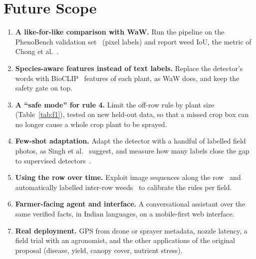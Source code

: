 \chapter{Future Scope}\label{ch:future}

\begin{enumerate}
\item \textbf{A like-for-like comparison with WaW.} Run the pipeline on the PhenoBench validation
  set~\cite{weyler2024phenobench} (pixel labels) and report weed IoU, the metric of Chong et
  al.~\cite{chong2025zeroshot}.
\item \textbf{Species-aware features instead of text labels.} Replace the detector's words with
  BioCLIP~\cite{stevens2024bioclip} features of each plant, as WaW does, and keep the safety gate on
  top.
\item \textbf{A ``safe mode'' for rule 4.} Limit the off-row rule by plant size (Table~\ref{tab:f1}),
  tested on new held-out data, so that a missed crop box can no longer cause a whole crop plant to be sprayed.
\item \textbf{Few-shot adaptation.} Adapt the detector with a handful of labelled field photos, as
  Singh et al.~\cite{singh2025fewshot} suggest, and measure how many labels close the gap to supervised
  detectors~\cite{rahman2023cotton,dang2023yoloweeds}.
\item \textbf{Using the row over time.} Exploit image sequences along the row~\cite{lottes2018fcn,lottes2020stem}
  and automatically labelled inter-row weeds~\cite{bah2018unsupervised} to calibrate the rules per field.
\item \textbf{Farmer-facing agent and interface.} A conversational assistant over the same verified
  facts, in Indian languages, on a mobile-first web interface.
\item \textbf{Real deployment.} GPS from drone or sprayer metadata, nozzle latency, a field trial with
  an agronomist, and the other applications of the original proposal (disease, yield, canopy cover,
  nutrient stress).
\end{enumerate}
